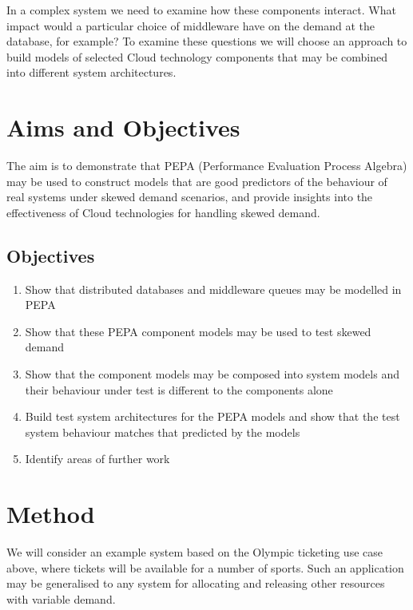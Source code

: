 \documentclass{llncs}
\begin{document}
In a complex system we need to examine how these components interact.  What impact would a particular choice of middleware have on the demand at the database, for example?  To examine these questions we will choose an approach to build models of selected Cloud technology components that may be combined into different system architectures.

%
%

\section{Aims and Objectives}

The aim is to demonstrate that PEPA (Performance Evaluation Process Algebra) \cite{RN1051} may be used to construct models that are good predictors of the behaviour of real systems under skewed demand scenarios, and provide insights into the effectiveness of Cloud technologies for handling skewed demand.

\subsection{Objectives}
\begin{enumerate}
	\item Show that distributed databases and middleware queues may be modelled in PEPA
	\item Show that these PEPA component models may be used to test skewed demand 
	\item Show that the component models may be composed into system models and their behaviour under test is different to the components alone
	\item Build test system architectures for the PEPA models and show that the test system behaviour matches that predicted by the models
	\item Identify areas of further work
\end{enumerate}

\section{Method}

We will consider an example system based on the Olympic ticketing use case above, where tickets will be available for a number of sports.  Such an application may be generalised to any system for allocating and releasing other resources with variable demand.
\end{document}

